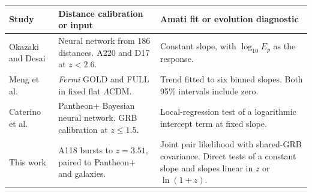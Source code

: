 \begin{tabular}{@{}>{\raggedright\arraybackslash}p{.22\linewidth}
                   >{\raggedright\arraybackslash}p{.35\linewidth}
                   >{\raggedright\arraybackslash}p{.38\linewidth}@{}}
 \toprule
 Study & Distance calibration or input & Amati fit or evolution diagnostic \\
 \midrule
 Okazaki and Desai \citep{Okazaki2025} &
 Neural network from 186 \hii{} distances. A220 and D17 at \(z<2.6\). &
 Constant slope, with \(\log_{10}E_p\) as the response. \\
 \addlinespace[2pt]
 Meng et al.\ \citep{Meng2026} &
 \emph{Fermi} GOLD and FULL in fixed flat \(\Lambda\)CDM. &
 Trend fitted to six binned slopes. Both 95\% intervals include zero. \\
 \addlinespace[2pt]
 Caterino et al.\ \citep{Caterino2026} &
 Pantheon+ Bayesian neural network. GRB calibration at \(z\leq1.5\). &
 Local-regression test of a logarithmic intercept term at fixed slope. \\
 \addlinespace[2pt]
 This work &
 83 A118 bursts to \(z=3.51\), paired to Pantheon+ and \hii{} galaxies. &
 Joint pair likelihood with shared-GRB covariance. Direct tests of a constant slope and slopes linear in \(z\) or \(\ln(1+z)\). \\
 \bottomrule
 \end{tabular}
